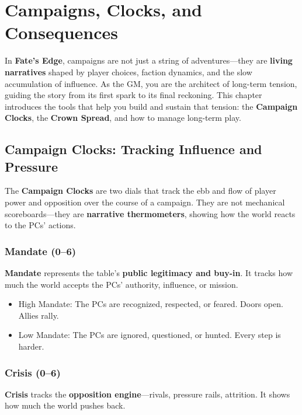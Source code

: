\chapter{Campaigns, Clocks, and Consequences}

In \textbf{Fate's Edge}, campaigns are not just a string of adventures---they are \textbf{living narratives} shaped by player choices, faction dynamics, and the slow accumulation of influence. As the GM, you are the architect of long-term tension, guiding the story from its first spark to its final reckoning. This chapter introduces the tools that help you build and sustain that tension: the \textbf{Campaign Clocks}, the \textbf{Crown Spread}, and how to manage long-term play.

\section*{Campaign Clocks: Tracking Influence and Pressure}

The \textbf{Campaign Clocks} are two dials that track the ebb and flow of player power and opposition over the course of a campaign. They are not mechanical scoreboards---they are \textbf{narrative thermometers}, showing how the world reacts to the PCs' actions.

\subsection*{Mandate (0--6)}

\textbf{Mandate} represents the table's \textbf{public legitimacy and buy-in}. It tracks how much the world accepts the PCs' authority, influence, or mission.

\begin{itemize}
    \item High Mandate: The PCs are recognized, respected, or feared. Doors open. Allies rally.
    \item Low Mandate: The PCs are ignored, questioned, or hunted. Every step is harder.
\end{itemize}

\subsection*{Crisis (0--6)}

\textbf{Crisis} tracks the \textbf{opposition engine}---rivals, pressure rails, attrition. It shows how much the world pushes back.

